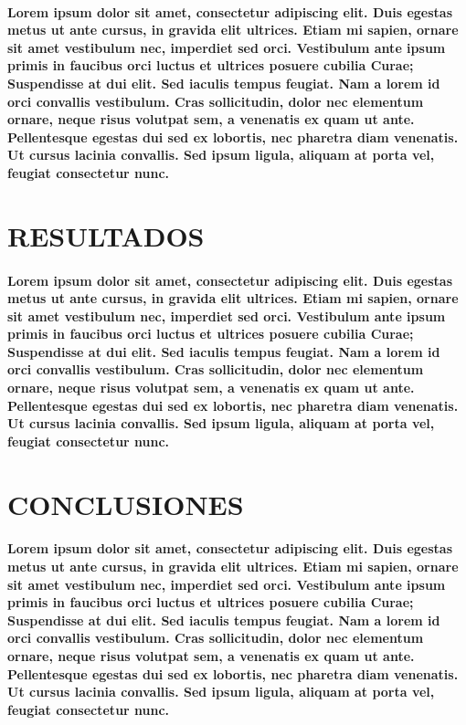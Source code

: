\documentclass[10pt, twocolumn]{article}
\begin{document}
\paragraph{Lorem ipsum dolor sit amet, consectetur adipiscing elit. Duis egestas metus ut ante cursus, in gravida elit ultrices. Etiam mi sapien, ornare sit amet vestibulum nec, imperdiet sed orci. Vestibulum ante ipsum primis in faucibus orci luctus et ultrices posuere cubilia Curae; Suspendisse at dui elit. Sed iaculis tempus feugiat. Nam a lorem id orci convallis vestibulum. Cras sollicitudin, dolor nec elementum ornare, neque risus volutpat sem, a venenatis ex quam ut ante. Pellentesque egestas dui sed ex lobortis, nec pharetra diam venenatis. Ut cursus lacinia convallis. Sed ipsum ligula, aliquam at porta vel, feugiat consectetur nunc.}

\section{RESULTADOS}
\paragraph{Lorem ipsum dolor sit amet, consectetur adipiscing elit. Duis egestas metus ut ante cursus, in gravida elit ultrices. Etiam mi sapien, ornare sit amet vestibulum nec, imperdiet sed orci. Vestibulum ante ipsum primis in faucibus orci luctus et ultrices posuere cubilia Curae; Suspendisse at dui elit. Sed iaculis tempus feugiat. Nam a lorem id orci convallis vestibulum. Cras sollicitudin, dolor nec elementum ornare, neque risus volutpat sem, a venenatis ex quam ut ante. Pellentesque egestas dui sed ex lobortis, nec pharetra diam venenatis. Ut cursus lacinia convallis. Sed ipsum ligula, aliquam at porta vel, feugiat consectetur nunc.}

\section{CONCLUSIONES}
\paragraph{Lorem ipsum dolor sit amet, consectetur adipiscing elit. Duis egestas metus ut ante cursus, in gravida elit ultrices. Etiam mi sapien, ornare sit amet vestibulum nec, imperdiet sed orci. Vestibulum ante ipsum primis in faucibus orci luctus et ultrices posuere cubilia Curae; Suspendisse at dui elit. Sed iaculis tempus feugiat. Nam a lorem id orci convallis vestibulum. Cras sollicitudin, dolor nec elementum ornare, neque risus volutpat sem, a venenatis ex quam ut ante. Pellentesque egestas dui sed ex lobortis, nec pharetra diam venenatis. Ut cursus lacinia convallis. Sed ipsum ligula, aliquam at porta vel, feugiat consectetur nunc.}
\end{document}
